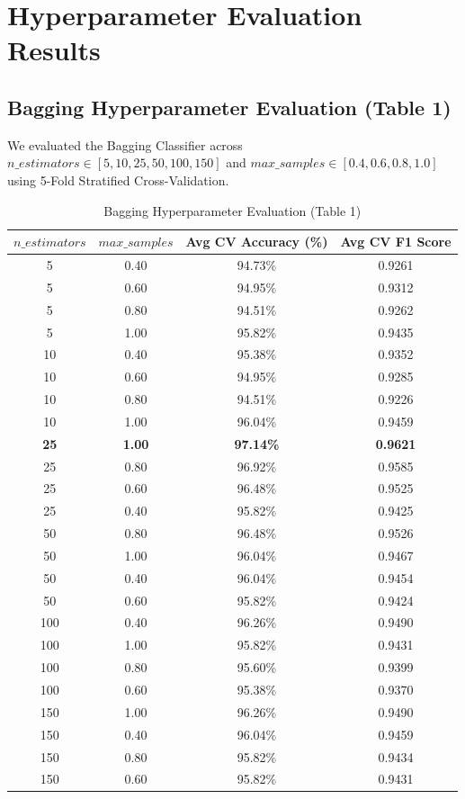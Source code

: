 \documentclass[12pt,a4paper]{article}
\begin{document}
\section{Hyperparameter Evaluation Results}

\subsection{Bagging Hyperparameter Evaluation (Table 1)}
We evaluated the Bagging Classifier across $n\_estimators \in [5, 10, 25, 50, 100, 150]$ and $max\_samples \in [0.4, 0.6, 0.8, 1.0]$ using 5-Fold Stratified Cross-Validation.

\begin{table}[H]
\centering
\begin{tabular}{cccc}
\toprule
\textbf{$n\_estimators$} & \textbf{$max\_samples$} & \textbf{Avg CV Accuracy (\%)} & \textbf{Avg CV F1 Score} \\
\midrule
5 & 0.40 & 94.73\% & 0.9261 \\
5 & 0.60 & 94.95\% & 0.9312 \\
5 & 0.80 & 94.51\% & 0.9262 \\
5 & 1.00 & 95.82\% & 0.9435 \\
10 & 0.40 & 95.38\% & 0.9352 \\
10 & 0.60 & 94.95\% & 0.9285 \\
10 & 0.80 & 94.51\% & 0.9226 \\
10 & 1.00 & 96.04\% & 0.9459 \\
\textbf{25} & \textbf{1.00} & \textbf{97.14\%} & \textbf{0.9621} \\
25 & 0.80 & 96.92\% & 0.9585 \\
25 & 0.60 & 96.48\% & 0.9525 \\
25 & 0.40 & 95.82\% & 0.9425 \\
50 & 0.80 & 96.48\% & 0.9526 \\
50 & 1.00 & 96.04\% & 0.9467 \\
50 & 0.40 & 96.04\% & 0.9454 \\
50 & 0.60 & 95.82\% & 0.9424 \\
100 & 0.40 & 96.26\% & 0.9490 \\
100 & 1.00 & 95.82\% & 0.9431 \\
100 & 0.80 & 95.60\% & 0.9399 \\
100 & 0.60 & 95.38\% & 0.9370 \\
150 & 1.00 & 96.26\% & 0.9490 \\
150 & 0.40 & 96.04\% & 0.9459 \\
150 & 0.80 & 95.82\% & 0.9434 \\
150 & 0.60 & 95.82\% & 0.9431 \\
\bottomrule
\end{tabular}
\caption{Bagging Hyperparameter Evaluation (Table 1)}
\end{table}
\end{document}

